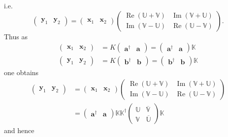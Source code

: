 \documentclass[aps, preprint]{revtex4}
\begin{document}
i.e.
\begin{equation}\left (\begin{array}{cc}\mathbf{y}_{1} & \mathbf{y}_{2}\end{array}\right ) =\left (\begin{array}{cc}\mathbf{x}_{1} & \mathbf{x}_{2}\end{array}\right ) \left (\begin{array}{cc}\ensuremath{\operatorname*{Re}} \left (\mathbb{U} +\mathbb{V}\right ) & \ensuremath{\operatorname*{Im}} \left (\mathbb{V} +\mathbb{U}\right ) \\
\ensuremath{\operatorname*{Im}} \left (\mathbb{V} -\mathbb{U}\right ) & \ensuremath{\operatorname*{Re}} \left (\mathbb{U} -\mathbb{V}\right )\end{array}\right )\text{.}
\end{equation}Thus as
\begin{align}\left (\begin{array}{cc}\mathbf{x}_{1} & \mathbf{x}_{2}\end{array}\right ) &  =K \left (\begin{array}{cc}\mathbf{a}^{ \dag } & \mathbf{a}\end{array}\right ) =\left (\begin{array}{cc}\mathbf{a}^{ \dag } & \mathbf{a}\end{array}\right ) \mathbb{K} \\
\left (\begin{array}{cc}\mathbf{y}_{1} & \mathbf{y}_{2}\end{array}\right ) &  =K \left (\begin{array}{cc}\mathbf{b}^{ \dag } & \mathbf{b}\end{array}\right ) =\left (\begin{array}{cc}\mathbf{b}^{ \dag } & \mathbf{b}\end{array}\right ) \mathbb{K}\end{align}one obtains
\begin{align}\left (\begin{array}{cc}\mathbf{y}_{1} & \mathbf{y}_{2}\end{array}\right ) &  =\left (\begin{array}{cc}\mathbf{x}_{1} & \mathbf{x}_{2}\end{array}\right ) \left (\begin{array}{cc}\ensuremath{\operatorname*{Re}} \left (\mathbb{U} +\mathbb{V}\right ) & \ensuremath{\operatorname*{Im}} \left (\mathbb{V} +\mathbb{U}\right ) \\
\ensuremath{\operatorname*{Im}} \left (\mathbb{V} -\mathbb{U}\right ) & \ensuremath{\operatorname*{Re}} \left (\mathbb{U} -\mathbb{V}\right )\end{array}\right ) \\
 &  =\left (\begin{array}{cc}\mathbf{a}^{ \dag } & \mathbf{a}\end{array}\right ) \mathbb{K} \mathbb{K}^{ \dag } \left (\begin{array}{cc}\mathbb{U} & \overline{\mathbb{V}} \\
\mathbb{V} & \overline{\mathbb{U}}\end{array}\right ) \mathbb{K}\end{align}and hence
\end{document}
